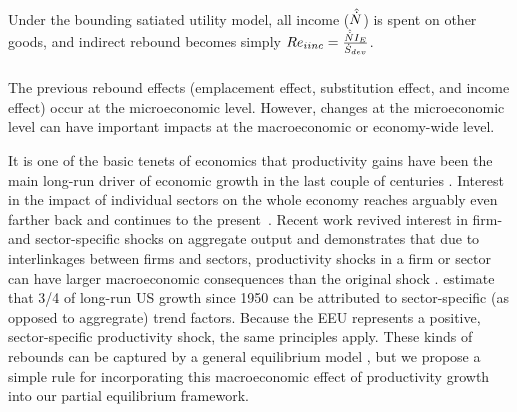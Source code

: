 \documentclass[12pt]{article}\usepackage[]{graphicx}\usepackage[]{xcolor}
\begin{document}
Under the bounding satiated utility model,
all income ($\hat{\dot{N}}$) is spent on other goods,
and indirect rebound becomes simply
$Re_{iinc} = \frac{\hat{\dot{N}} I_E}{\dot{S}_{dev}}$.


\subsubsection{\Macroeffect}
\label{sec:macro_effect_main_paper}

The previous rebound effects 
(emplacement effect, substitution effect, and income effect)
occur at the microeconomic level. 
However, changes at the microeconomic level can 
have important impacts at the macroeconomic or economy-wide level.

It is one of the basic tenets of economics
that productivity gains have been the main long-run driver of economic growth
in the last couple of centuries \citep{Smith1776, Marx1867, Solow1957}.
Interest in the impact of individual sectors on the whole economy reaches arguably
even farther back \citep{Quesnay1759}
and continues to the present~\citep{Leontief1986}. 
Recent work revived 
interest in firm- and sector-specific shocks on aggregate output and
demonstrates that due to interlinkages between firms and sectors, 
productivity shocks in a firm or sector 
can have larger macroeconomic consequences than the original
shock \citep{Gabaix2011,Acemoglu2012eme,Baqaee2019}. 
\citet{Foerster2022} estimate
that 3/4 of long-run US growth since 1950
can be attributed to sector-specific
(as opposed to aggregrate) trend factors. 
Because the EEU represents a positive, sector-specific
productivity shock,
the same principles apply. 
These kinds of rebounds can be captured
by a general equilibrium model \citep{Stern2020}, but
we propose a simple rule for
incorporating this macroeconomic effect of productivity
growth into our partial equilibrium framework.
\end{document}
